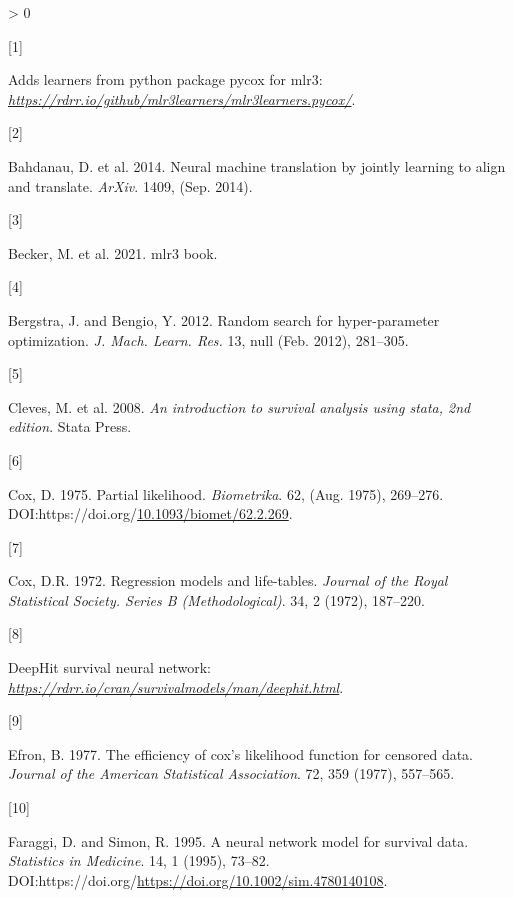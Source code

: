 \documentclass[
]{article}
\newlength{\cslhangindent}
\newlength{\csllabelwidth}
\newenvironment{CSLReferences}[2] %
 {%
  \setlength{\parindent}{0pt}
  \ifodd #1 \everypar{\setlength{\hangindent}{\cslhangindent}}\ignorespaces\fi
  \ifnum #2 > 0
  \setlength{\parskip}{#2\baselineskip}
  \fi
 }%
 {}
\newcommand{\CSLLeftMargin}[1]{\parbox[t]{\csllabelwidth}{#1}}
\newcommand{\CSLRightInline}[1]{\parbox[t]{\linewidth - \csllabelwidth}{#1}\break}
\begin{document}
\hypertarget{refs}{}
\begin{CSLReferences}{0}{0}
\leavevmode\hypertarget{ref-mlr3learners-pycox}{}%
\CSLLeftMargin{{[}1{]} }
\CSLRightInline{Adds learners from python package pycox for mlr3: \emph{\url{https://rdrr.io/github/mlr3learners/mlr3learners.pycox/}}.}

\leavevmode\hypertarget{ref-temporal-attention-mechanism}{}%
\CSLLeftMargin{{[}2{]} }
\CSLRightInline{Bahdanau, D. et al. 2014. Neural machine translation by jointly learning to align and translate. \emph{ArXiv}. 1409, (Sep. 2014).}

\leavevmode\hypertarget{ref-mlr3-book}{}%
\CSLLeftMargin{{[}3{]} }
\CSLRightInline{Becker, M. et al. 2021. mlr3 book.}

\leavevmode\hypertarget{ref-random-search}{}%
\CSLLeftMargin{{[}4{]} }
\CSLRightInline{Bergstra, J. and Bengio, Y. 2012. Random search for hyper-parameter optimization. \emph{J. Mach. Learn. Res.} 13, null (Feb. 2012), 281--305.}

\leavevmode\hypertarget{ref-stata-intro-survival}{}%
\CSLLeftMargin{{[}5{]} }
\CSLRightInline{Cleves, M. et al. 2008. \emph{An introduction to survival analysis using stata, 2nd edition}. Stata Press.}

\leavevmode\hypertarget{ref-cox-partial-likelihood}{}%
\CSLLeftMargin{{[}6{]} }
\CSLRightInline{Cox, D. 1975. Partial likelihood. \emph{Biometrika}. 62, (Aug. 1975), 269--276. DOI:https://doi.org/\href{https://doi.org/10.1093/biomet/62.2.269}{10.1093/biomet/62.2.269}.}

\leavevmode\hypertarget{ref-cox-ph}{}%
\CSLLeftMargin{{[}7{]} }
\CSLRightInline{Cox, D.R. 1972. Regression models and life-tables. \emph{Journal of the Royal Statistical Society. Series B (Methodological)}. 34, 2 (1972), 187--220.}

\leavevmode\hypertarget{ref-deephit-r}{}%
\CSLLeftMargin{{[}8{]} }
\CSLRightInline{DeepHit survival neural network: \emph{\url{https://rdrr.io/cran/survivalmodels/man/deephit.html}}.}

\leavevmode\hypertarget{ref-efron-partial-likelihood}{}%
\CSLLeftMargin{{[}9{]} }
\CSLRightInline{Efron, B. 1977. The efficiency of cox's likelihood function for censored data. \emph{Journal of the American Statistical Association}. 72, 359 (1977), 557--565.}

\leavevmode\hypertarget{ref-Faraggi-and-Simon-1995}{}%
\CSLLeftMargin{{[}10{]} }
\CSLRightInline{Faraggi, D. and Simon, R. 1995. A neural network model for survival data. \emph{Statistics in Medicine}. 14, 1 (1995), 73--82. DOI:https://doi.org/\url{https://doi.org/10.1002/sim.4780140108}.}


\end{CSLReferences}
\end{document}
